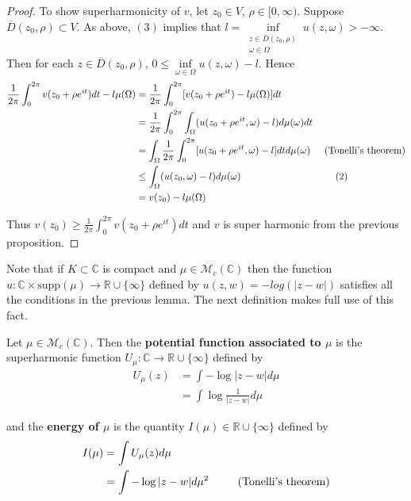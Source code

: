 \documentclass{amsart}
\newcommand{\C}{\mathbb{C}}
\newcommand{\MCM}{\mathcal{M}}
\newcommand{\RR}{\mathbb{R} \cup \{\infty\}}
\begin{document}
\begin{proof}
To show superharmonicity of $v$, let $z_0 \in V$, $\rho \in [0,\infty)$. Suppose $\overline{D}(z_0,\rho) \subset V$. As above, $(3)$ implies that $l= \inf\limits_{\substack{z \in \overline{D}(z_0,\rho) \\ \omega \in \Omega}}u(z, \omega)> -\infty$. Then for each $z \in \overline{D}(z_0,\rho)$, $0 \leq \inf\limits_{\omega \in \Omega}u(z, \omega) - l$. Hence  
\begin{align*}
\frac{1}{2\pi}\int_0^{2\pi}v(z_0 + \rho e^{it})dt - l\mu(\Omega)
&= \frac{1}{2\pi}\int_0^{2\pi}[v(z_0 + \rho e^{it}) - l\mu(\Omega)]dt\\
&= \frac{1}{2\pi}\int_0^{2\pi}\int_{\Omega}(u(z_0 + \rho e^{it}, \omega) - l)d\mu(\omega)dt\\
&= \int_{\Omega}\frac{1}{2\pi}\int_0^{2\pi}[u(z_0 + \rho e^{it}, \omega) - l]dtd\mu(\omega) \hspace{5mm} \text{(Tonelli's theorem)}\\
&\leq \int_{\Omega}(u(z_0, \omega) - l)d\mu(\omega) \hspace{34mm} (2)\\
&= v(z_0) - l\mu(\Omega)
\end{align*}  

Thus $v(z_0) \geq \frac{1}{2\pi}\int_0^{2\pi}v(z_0 + \rho e^{it})dt$ and $v$ is super harmonic from the previous proposition. 

\end{proof}

Note that if $K \subset \C$ is compact and $\mu \in \MCM_c(\C)$ then the function $u: \C \times \mathrm{supp}(\mu) \rightarrow \RR$ defined by $u(z,w) = -log(|z-w|)$ satisfies all the conditions in the previous lemma. The next definition makes full use of this fact.  

Let $\mu \in \MCM_c(\C)$. Then the \textbf{potential function associated to $\mu$} is the superharmonic function $U_{\mu}: \C \rightarrow \RR$ defined by 
\begin{align*}
U_{\mu}(z) 
&= \int-\log|z-w|d\mu\\
&= \int \log\frac{1}{|z-w|}d\mu
\end{align*}

and the \textbf{energy of $\mu$} is the quantity $I(\mu) \in \RR$ defined by 
\begin{align*}
I(\mu) 
&= \int U_{\mu}(z)d\mu \\
&= \int-\log|z-w|d\mu^2 \hspace{8mm} \text{ (Tonelli's theorem)}
\end{align*}
\end{document}
